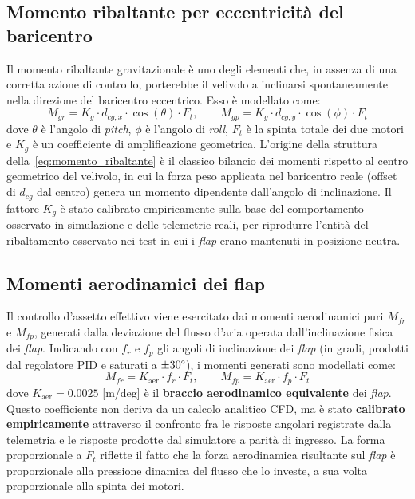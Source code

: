 \documentclass[11pt]{report}
\begin{document}
	\subsection{Momento ribaltante per eccentricità del baricentro}
	Il momento ribaltante gravitazionale è uno degli elementi che, in assenza di una corretta azione di controllo, porterebbe il velivolo a inclinarsi spontaneamente nella direzione del baricentro eccentrico. Esso è modellato come:
	\begin{equation}
		M_{gr} = K_g \cdot d_{cg,x} \cdot \cos(\theta) \cdot F_t,
		\qquad
		M_{gp} = K_g \cdot d_{cg,y} \cdot \cos(\phi) \cdot F_t
		\label{eq:momento_ribaltante}
	\end{equation}
	dove $\theta$ è l'angolo di \textit{pitch}, $\phi$ è l'angolo di \textit{roll}, $F_t$ è la spinta totale dei due motori e $K_g$ è un coefficiente di amplificazione geometrica. L'origine della struttura della~\eqref{eq:momento_ribaltante} è il classico bilancio dei momenti rispetto al centro geometrico del velivolo, in cui la forza peso applicata nel baricentro reale (offset di $d_{cg}$ dal centro) genera un momento dipendente dall'angolo di inclinazione. Il fattore $K_g$ è stato calibrato empiricamente sulla base del comportamento osservato in simulazione e delle telemetrie reali, per riprodurre l'entità del ribaltamento osservato nei test in cui i \textit{flap} erano mantenuti in posizione neutra.
	
	\subsection{Momenti aerodinamici dei flap}
	\label{sec:modello_spinta_flap}
	Il controllo d'assetto effettivo viene esercitato dai momenti aerodinamici puri $M_{fr}$ e $M_{fp}$, generati dalla deviazione del flusso d'aria operata dall'inclinazione fisica dei \textit{flap}. Indicando con $f_r$ e $f_p$ gli angoli di inclinazione dei \textit{flap} (in gradi, prodotti dal regolatore PID e saturati a $\pm 30\degree$), i momenti generati sono modellati come:
	\begin{equation}
		M_{fr} = K_\text{aer} \cdot f_r \cdot F_t,
		\qquad
		M_{fp} = K_\text{aer} \cdot f_p \cdot F_t
		\label{eq:momento_flap}
	\end{equation}
	dove $K_\text{aer} = 0.0025$ [m/deg] è il \textbf{braccio aerodinamico equivalente} dei \textit{flap}. Questo coefficiente non deriva da un calcolo analitico CFD, ma è stato \textbf{calibrato empiricamente} attraverso il confronto fra le risposte angolari registrate dalla telemetria e le risposte prodotte dal simulatore a parità di ingresso. La forma proporzionale a $F_t$ riflette il fatto che la forza aerodinamica risultante sul \textit{flap} è proporzionale alla pressione dinamica del flusso che lo investe, a sua volta proporzionale alla spinta dei motori.
	
\end{document}
